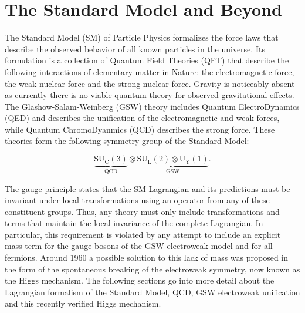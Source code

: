 \chapter{The Standard Model and Beyond} \label{chap:standard_model}

The Standard Model (SM) of Particle Physics formalizes the force laws that
describe the observed behavior of all known particles in the universe. Its
formulation is a collection of Quantum Field Theories (QFT) that describe the
following interactions of elementary matter in Nature: the electromagnetic
force, the weak nuclear force and the strong nuclear force.  Gravity is
noticeably absent as currently there is no viable quantum theory for observed
gravitational effects.  The Glashow-Salam-Weinberg (GSW) \cite{Glashow:1961tr,
Salam:1968, Weinberg:1967tq} theory includes Quantum ElectroDynamics
(QED) and describes the unification of the electromagnetic and weak forces,
while Quantum ChromoDyanmics (QCD) \cite{Campbell:2017hsr} describes the strong
force.  These theories form the following symmetry group of the Standard Model:

\begin{equation} \label{eq:standardmodel:symmetry_group}
  \underbrace{\text{SU}_\text{C}(3)}_\text{QCD} \otimes
\underbrace{\text{SU}_\text{L}(2) \otimes \text{U}_\text{Y}(1)}_\text{GSW}.
\end{equation}

The gauge principle states that the SM Lagrangian and its predictions must be
invariant under local transformations using an operator from any of these
constituent groups.  Thus, any theory must only include transformations and
terms that maintain the local invariance of the complete Lagrangian.  In
particular, this requirement is violated by any attempt to include an explicit
mass term for the gauge bosons of the GSW electroweak model and for all
fermions.  Around 1960 a possible solution to this lack of mass was proposed in
the form of the spontaneous breaking of the electroweak symmetry, now known as
the Higgs mechanism.  The following sections go into more detail about the
Lagrangian formalism of the Standard Model, QCD, GSW electroweak unification
and this recently verified Higgs mechanism.





